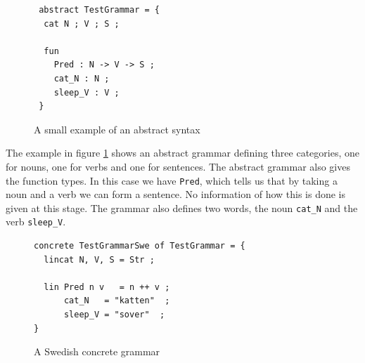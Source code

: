 \documentclass{report}
\begin{document}
\begin{figure}[h]
\begin{verbatim}
 abstract TestGrammar = {
  cat N ; V ; S ;

  fun 
    Pred : N -> V -> S ;
    cat_N : N ;
    sleep_V : V ;
 }
\end{verbatim}
\caption{A small example of an abstract syntax}
\label{fig:gfAbstract1}
\end{figure}

The example in figure \ref{fig:gfAbstract1} shows an abstract grammar defining three categories, %
one for nouns, one for verbs and one for sentences. The abstract grammar also gives
the function types. In this case we have \verb|Pred|, which tells us that by
taking a noun and a verb we can form a sentence.  No information of how this is
done is given at this stage. The grammar also defines two words, the noun
\verb|cat_N| and the verb \verb|sleep_V|. 

\begin{figure}[h]
\begin{verbatim}
concrete TestGrammarSwe of TestGrammar = {
  lincat N, V, S = Str ;
   
  lin Pred n v   = n ++ v ;
      cat_N   = "katten"  ;
      sleep_V = "sover"  ;
}
\end{verbatim}
\caption{A Swedish concrete grammar}
\label{fig:gfSweCnc1}
\end{figure}
\end{document}
